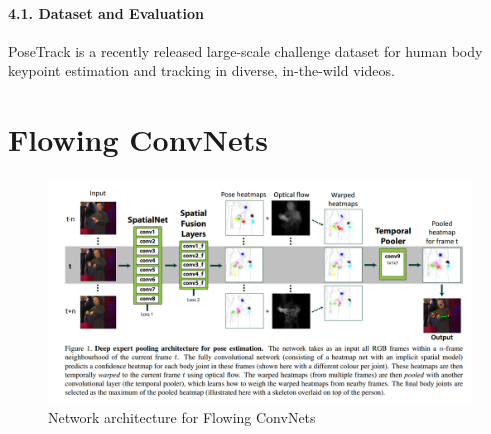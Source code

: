 \documentclass[a4paper]{report}
\begin{document}
\subsubsection*{4.1. Dataset and Evaluation}
PoseTrack is a recently released large-scale challenge dataset for human body keypoint estimation and tracking in diverse, in-the-wild videos.

\chapter*{Flowing ConvNets}
\begin{figure}[h]
    \centering
    \includegraphics[width=0.8 \textwidth]{./entities/flowing_convnets.PNG}
    \caption{Network architecture for Flowing ConvNets}
    \label{fig:Flowing_ConvNets}
\end{figure}
\end{document}
